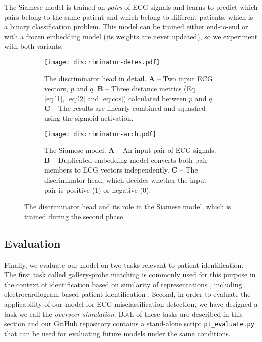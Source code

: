 \documentclass[preprint,12pt]{elsarticle}
\begin{document}
The Siamese model is trained on \textit{pairs} of ECG signals and learns to predict which pairs belong to the same patient and which belong to different patients, which is a binary classification problem. This model can be trained either end-to-end or with a frozen embedding model (its weights are never updated), so we experiment with both variants.

\begin{figure}[h]
    \centering
    \begin{subfigure}[b]{0.45\textwidth}
    \centering
    \texttt{[image: discriminator-detes.pdf]}
    \caption{The discriminator head in detail. \textbf{A} -- Two input ECG vectors, $p$ and $q$. \textbf{B} -- Three distance metrics (Eq. \ref{eq:l1}, \ref{eq:l2} and \ref{eq:cos}) calculated between $p$ and $q$. \textbf{C} -- The results are linearly combined and squashed using the sigmoid activation. }
    \label{fig:discriminator-detail}
    \end{subfigure}
    \hfill
    \begin{subfigure}[b]{0.45\textwidth}
    \centering
    \texttt{[image: discriminator-arch.pdf]}
    \caption{The Siamese model. \textbf{A} -- An input pair of ECG signals. \textbf{B} -- Duplicated embedding model converts both pair members to ECG vectors independently. \textbf{C} -- The discriminator head, which decides whether the input pair is positive (1) or negative (0). }
    \label{fig:siamese-model}
    \end{subfigure}
    \hfill
    \caption{The discriminator head and its role in the Siamese model, which is trained during the second phase.}
    \label{fig:discriminator-arch}
\end{figure}



\subsection{Evaluation}
\label{sec:mistake-detection}

Finally, we evaluate our model on two tasks relevant to patient identification. The first task called gallery-probe matching is commonly used for this purpose in the context of identification based on similarity of representations \cite{cheng2011custom, hossain2010clothing, gross2006model, shen2018person}, including electrocardiogram-based patient identification \cite{oh2022lead}. Second, in order to evaluate the applicability of our model for ECG misclassification detection, we have designed a task we call the \textit{overseer simulation}. Both of these tasks are described in this section and our GitHub repository contains a stand-alone script \verb|pt_evaluate.py| that can be used for evaluating future models under the same conditions.
\end{document}
